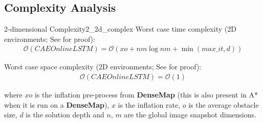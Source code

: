 
\newpage

\subsection{Complexity Analysis}

\begin{Theo}{2-dimensional Complexity}{2_2d_complex}
Worst case time complexity (2D environments; See  for proof):
\begin{align*}
    \mathcal{O}(CAEOnlineLSTM) = \mathcal{O}(xo + nm \log nm + \min(max\_it, d))
\end{align*}

Worst case space complexity (2D environments; See  for proof):
\begin{align*}
    \mathcal{O}(CAEOnlineLSTM) = \mathcal{O}(1)
\end{align*}

where $xo$ is the inflation pre-process from \textbf{DenseMap} (this is also present in A* when it is run on a \textbf{DenseMap}), $x$ is the inflation rate, $o$ is the average obstacle size, $d$ is the solution depth and $n$, $m$ are the global image snapshot dimensions.

\end{Theo}

